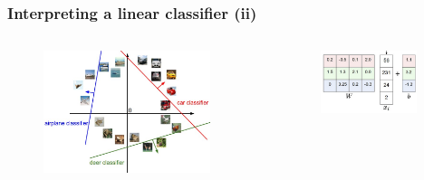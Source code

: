 \begin{frame}
        \frametitle{Interpreting a linear classifier (ii)}

        \begin{columns}
        
                \begin{figure}
                        \includegraphics[width=0.9\textwidth]{Pics/pixelspace.jpeg}
                \end{figure}

                \begin{figure}
                        \includegraphics[width=0.9\textwidth]{Pics/Wb.png}
                \end{figure}

        \end{columns}

\end{frame}

